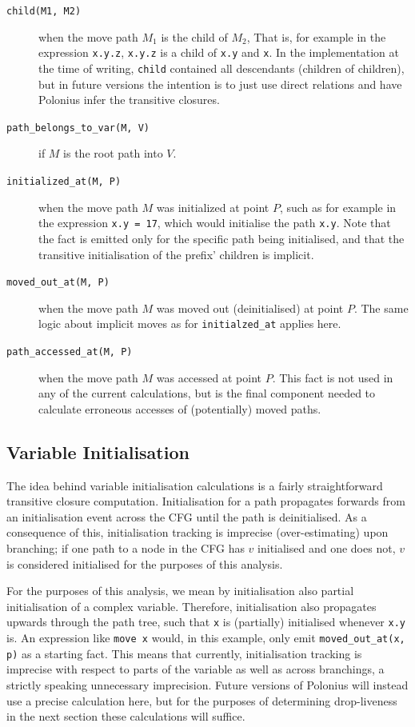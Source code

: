 \documentclass[11pt,a4paper,twoside,openany]{report}
\newcommand{\InRust}[1]{\texttt{#1}}
\newcommand{\InDatalog}[1]{\texttt{#1}}
\begin{document}
\begin{description}
\item[\InDatalog{child(M1, M2)}] when the move path $M_1$ is the child of $M_2$,
  That is, for example in the expression \InRust{x.y.z}, \InRust{x.y.z} is a
  child of \InRust{x.y} and \InRust{x}. In the implementation at the time of
  writing, \InDatalog{child} contained all descendants (children of children),
  but in future versions the intention is to just use direct relations and have
  Polonius infer the transitive closures.

\item[\InDatalog{path_belongs_to_var(M, V)}] if $M$ is the root path into $V$.

\item[\InDatalog{initialized_at(M, P)}] when the move path $M$ was initialized
  at point $P$, such as for example in the expression \InRust{x.y = 17}, which would
  initialise the path \InRust{x.y}. Note that the fact is emitted only for the
  specific path being initialised, and that the transitive initialisation of the
  prefix' children is implicit.

\item[\InDatalog{moved_out_at(M, P)}] when the move path $M$ was moved out
  (deinitialised) at point $P$. The same logic about implicit moves as for
  \InDatalog{initialzed_at} applies here.

\item[\InDatalog{path_accessed_at(M, P)}] when the move path $M$ was accessed at
  point $P$. This fact is not used in any of the current calculations, but is
  the final component needed to calculate erroneous accesses of (potentially)
  moved paths.
\end{description}

\subsection{Variable Initialisation}
\label{sec:var-initalisation}

The idea behind variable initialisation calculations is a fairly straightforward
transitive closure computation. Initialisation for a path propagates forwards
from an initialisation event across the CFG until the path is deinitialised. As
a consequence of this, initialisation tracking is imprecise (over-estimating)
upon branching; if one path to a node in the CFG has $v$ initialised and one
does not, $v$ is considered initialised for the purposes of this analysis.

For the purposes of this analysis, we mean by initialisation also partial
initialisation of a complex variable. Therefore, initialisation also propagates
upwards through the path tree, such that \InRust{x} is (partially) initialised
whenever \InRust{x.y} is. An expression like \InRust{move x} would, in this
example, only emit \InDatalog{moved_out_at(x, p)} as a starting fact. This means
that currently, initialisation tracking is imprecise with respect to parts of
the variable as well as across branchings, a strictly speaking unnecessary
imprecision. Future versions of Polonius will instead use a precise calculation
here, but for the purposes of determining drop-liveness in the next section
these calculations will suffice.
\end{document}

